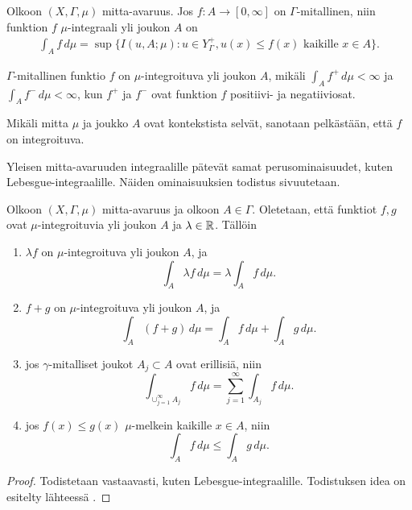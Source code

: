 \documentclass[12pt,oneside,a4paper]{amsbook} %
\begin{document}
\begin{definition}
    Olkoon $(X, \Gamma, \mu)$ mitta-avaruus. Jos $f: A \to [0, \infty]$ on $\Gamma$-mitallinen, niin funktion $f$ $\mu$-integraali yli joukon $A$ on
    \begin{align*}
        \int_A f \, d\mu = \sup\{I(u, A; \mu) : u \in Y_\Gamma^+, u(x) \le f(x) \text{ kaikille } x \in A\}.
    \end{align*}
\end{definition}

\begin{definition}
    $\Gamma$-mitallinen funktio $f$ on $\mu$-integroituva yli joukon $A$, mikäli $\int_A f^+ \, d\mu < \infty$ ja $\int_A f^-\, d\mu < \infty$, kun $f^+$ ja $f^-$ ovat funktion $f$ positiivi- ja negatiiviosat.
\end{definition}
Mikäli mitta $\mu$ ja joukko $A$ ovat kontekstista selvät, sanotaan pelkästään, että $f$ on integroituva.

Yleisen mitta-avaruuden integraalille pätevät samat perusominaisuudet, kuten Lebesgue-integraalille. Näiden ominaisuuksien todistus sivuutetaan.
\begin{lemma}\label{le:integralProperties}
    Olkoon $(X, \Gamma, \mu)$ mitta-avaruus ja olkoon $A\in \Gamma$. Oletetaan, että funktiot $f, g$ ovat $\mu$-integroituvia yli joukon $A$ ja $\lambda \in \mathbb{R}$. Tällöin
    \begin{enumerate}
        \item $\lambda f$ on $\mu$-integroituva yli joukon $A$, ja 
        \begin{equation*}
            \int_A \lambda f \, d\mu = \lambda \int_A f \, d\mu.
        \end{equation*}
        \item $f + g$ on $\mu$-integroituva yli joukon $A$, ja
        \begin{equation*}
            \int_A  (f+g) \, d\mu = \int_A  f \, d\mu + \int_A  g \, d\mu.
        \end{equation*}
        \item jos $\gamma$-mitalliset joukot $A_j \subset A$ ovat erillisiä, niin
        \begin{equation*}
            \int_{\cup_{j=1}^\infty A_j}f \, d\mu = \sum_{j=1}^\infty \int_{A_j} f\, d\mu.
        \end{equation*}
        \item jos $f(x) \le g(x)$ $\mu$-melkein kaikille $x \in A$, niin 
        \begin{equation*}
            \int_A f \, d\mu \le \int_A g \, d\mu.
        \end{equation*}
    \end{enumerate}
\end{lemma}
\begin{proof}
    Todistetaan vastaavasti, kuten Lebesgue-integraalille. Todistuksen idea on esitelty lähteessä \cite[s.113]{lehrbäck}.
\end{proof}
\end{document}
